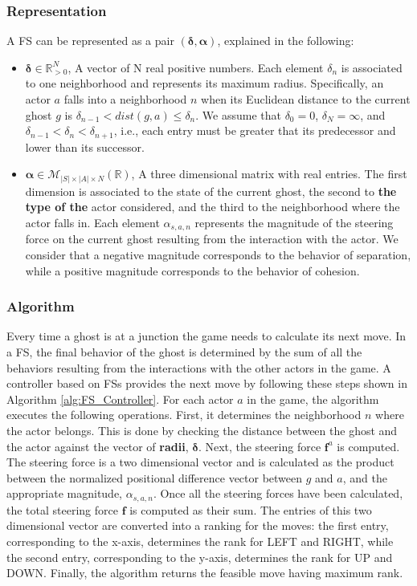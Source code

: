 \documentclass[journal]{IEEEtran}
\begin{document}
\subsubsection{Representation}
A FS can be represented as a pair $(\boldsymbol\delta, \boldsymbol\alpha)$, explained in the following:
\begin{itemize}
  \item $\boldsymbol\delta \in \mathbb{R}_{>0}^N$, A vector of N real positive numbers. Each element $\delta_n$ is associated to one neighborhood and represents its maximum radius. Specifically, an actor $a$ falls into a neighborhood $n$ when its Euclidean distance to the current ghost $g$ is $\delta_{n-1} < dist(g,a) \leq \delta_n$. We assume that $\delta_0 = 0$, $\delta_N = \infty$, and $\delta_{n-1} < \delta_n < \delta_{n+1}$, i.e., each entry must be greater that its predecessor and lower than its successor.
  \item $\boldsymbol\alpha \in \mathcal{M}_{|S| \times |A| \times N}(\mathbb{R})$, A three dimensional matrix with real entries. The first dimension is associated to the state of the current ghost, the second to \textbf{the type of the} actor considered, and the third to the neighborhood where the actor falls in. Each element $\alpha_{s,a,n}$ represents the magnitude of the steering force on the current ghost resulting from the interaction with the actor. We consider that a negative magnitude corresponds to the behavior of separation, while a positive magnitude corresponds to the behavior of cohesion.
\end{itemize}

\subsubsection{Algorithm}
Every time a ghost is at a junction the game needs to calculate its next move. In a FS, the final behavior of the ghost is determined by the sum of all the behaviors resulting from the interactions with the other actors in the game. A controller based on FSs provides the next move by following these steps shown in Algorithm \ref{alg:FS_Controller}. For each actor $a$ in the game, the algorithm executes the following operations. First, it determines the neighborhood $n$ where the actor belongs. This is done by checking the distance between the ghost and the actor against the vector of \textbf{radii}, $\boldsymbol\delta$. Next, the steering force $\mathbf{f}^a$ is computed. The steering force is a two dimensional vector and is calculated as the product between the normalized positional difference vector between $g$ and $a$, and the appropriate magnitude, $\alpha_{s,a,n}$. Once all the steering forces have been calculated, the total steering force $\mathbf{f}$ is computed as their sum. The entries of this two dimensional vector are converted into a ranking for the moves: the first entry, corresponding to the x-axis, determines the rank for LEFT and RIGHT, while the second entry, corresponding to the y-axis, determines the rank for UP and DOWN. Finally, the algorithm returns the feasible move having maximum rank.
\end{document}
